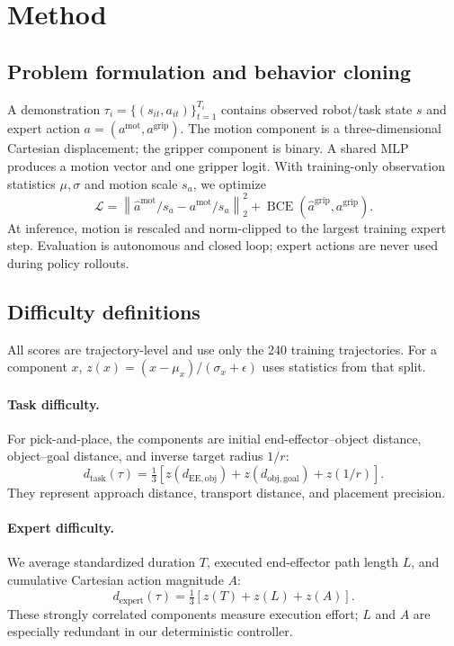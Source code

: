 \section{Method}
\label{sec:method}

\subsection{Problem formulation and behavior cloning}
A demonstration $\tau_i=\{(s_{it},a_{it})\}_{t=1}^{T_i}$ contains observed
robot/task state $s$ and expert action $a=(a^{\mathrm{mot}},a^{\mathrm{grip}})$.
The motion component is a three-dimensional Cartesian displacement; the
gripper component is binary. A shared MLP produces a motion vector and one
gripper logit. With training-only observation statistics $\mu,\sigma$ and
motion scale $s_a$, we optimize
\begin{equation}
\mathcal{L}=
\left\|\hat a^{\mathrm{mot}}/s_a-a^{\mathrm{mot}}/s_a\right\|_2^2
+\operatorname{BCE}(\hat a^{\mathrm{grip}},a^{\mathrm{grip}}).
\end{equation}
At inference, motion is rescaled and norm-clipped to the largest training
expert step. Evaluation is autonomous and closed loop; expert actions are
never used during policy rollouts.

\subsection{Difficulty definitions}
All scores are trajectory-level and use only the 240 training trajectories.
For a component $x$, $z(x)=(x-\mu_x)/(\sigma_x+\epsilon)$ uses statistics from
that split.

\paragraph{Task difficulty.}
For pick-and-place, the components are initial end-effector--object distance,
object--goal distance, and inverse target radius $1/r$:
\begin{equation}
d_{\mathrm{task}}(\tau)=\tfrac13[z(d_{\mathrm{EE,obj}})
+z(d_{\mathrm{obj,goal}})+z(1/r)].
\end{equation}
They represent approach distance, transport distance, and placement precision.

\paragraph{Expert difficulty.}
We average standardized duration $T$, executed end-effector path length $L$,
and cumulative Cartesian action magnitude $A$:
\begin{equation}
d_{\mathrm{expert}}(\tau)=\tfrac13[z(T)+z(L)+z(A)].
\end{equation}
These strongly correlated components measure execution effort; $L$ and $A$
are especially redundant in our deterministic controller.

